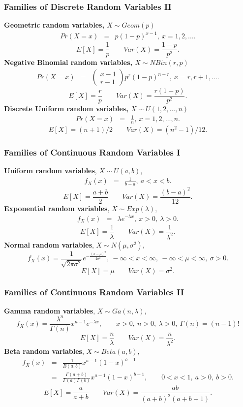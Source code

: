 \documentclass[compress]{beamer}
\begin{document}
\begin{frame}[t]
\frametitle{Families of Discrete Random Variables II}

{\bf Geometric random variables, $X \sim Geom(p)$}
\begin{eqnarray*}
Pr(X=x) &=& p(1-p)^{x-1}, \ x=1,2,\ldots.
\end{eqnarray*}
\[
E[X] = \frac{1}{p} \qquad Var(X) = \frac{1-p}{p^2}.
\]
{\bf Negative Binomial random variables, $X \sim NBin(r,p)$} 
\begin{eqnarray*}
Pr(X=x) &=& \left( \begin{array}{cc} x-1 \\ r-1 \end{array} \right) p^r (1-p)^{n-r}, \ x=r,r+1,\ldots.
\end{eqnarray*}
\[
E[X] = \frac{r}{p} \qquad Var(X) = \frac{r(1-p)}{p^2}. 
\]
{\bf Discrete Uniform random variables, $X \sim U(1,2,\ldots,n)$}
\begin{eqnarray*}
Pr(X=x) &=& \frac{1}{n}, \ x=1,2,\ldots,n.
\end{eqnarray*}
\[
E[X] = (n+1)/2 \qquad Var(X) = (n^2-1)/12.
\]
\end{frame}


\begin{frame}[t]
\frametitle{Families of Continuous Random Variables I}

{\bf Uniform random variables}, $X \sim U(a,b)$,
\begin{eqnarray*}
f_X(x) &=& \frac{1}{b-a}, \ a < x < b.
\end{eqnarray*}
\[
E[X]=\frac{a+b}{2} \qquad Var(X) = \frac{(b-a)^2}{12}.
\]
{\bf Exponential random variables}, $X \sim Exp(\lambda)$, 
\begin{eqnarray*}
f_X(x)&=& \lambda e^{-\lambda x}, \ x>0, \ \lambda>0.
\end{eqnarray*}
\[
E[X]= \frac{1}{\lambda} \qquad Var(X) = \frac{1}{\lambda^2}.
\]
{\bf Normal random variables}, $X \sim N(\mu,\sigma^2)$, 
\[
f_X(x) = \frac{1}{\sqrt{2\pi \sigma^2}} e^{-\frac{(x-\mu)^2}{2\sigma^2}}, \ -\infty < x < \infty, \ -\infty < \mu < \infty, \ \sigma>0.
\]
\[
E[X]= \mu \qquad Var(X) = \sigma^2.
\]
\end{frame}

\begin{frame}[t]
\frametitle{Families of Continuous Random Variables II}
{\bf Gamma random variables}, $X \sim Ga(n,\lambda)$,
\[
f_X(x) = \frac{\lambda^{n}}{\Gamma(n)} x^{n-1}
e^{-\lambda x}, \qquad x>0, \ n>0,\ \lambda>0, \ \Gamma(n)=(n-1)!
\]
\[
E[X] = \frac{n}{\lambda} \qquad Var(X) = \frac{n}{\lambda^2}. 
\]
{\bf Beta random variables}, $X \sim Beta(a,b)$,
\begin{eqnarray*}
f_X(x) &=& \frac{1}{B(a,b)} x^{a-1}(1-x)^{b-1} \\
&=&  \frac{\Gamma(a+b)}{\Gamma(a)\Gamma(b)} x^{a-1}(1-x)^{b-1},\qquad 0<x<1, \ a>0, \ b >0. 
\end{eqnarray*}
\[
E[X]=\frac{a}{a+b} \qquad  Var(X) = \frac{ab}{(a+b)^2(a+b+1)}.
\]
\end{frame}
\end{document}
